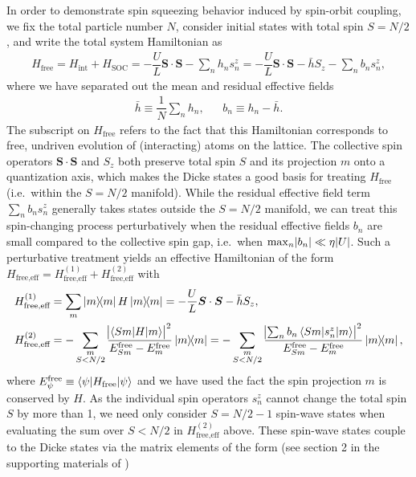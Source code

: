 \documentclass[aps,notitlepage,nofootinbib,11pt]{revtex4-1}
\renewcommand{\t}{\text} %
\newcommand{\f}[2]{\dfrac{#1}{#2}} %
\renewcommand{\v}{\bm} %
\renewcommand{\c}{\cdot} %
\newcommand{\bk}{\braket} %
\newcommand{\1}{\hat{\mathds{1}}}
\begin{document}
In order to demonstrate spin squeezing behavior induced by spin-orbit
coupling, we fix the total particle number $N$, consider initial
states with total spin $S=N/2$, and write the total system Hamiltonian
as
\begin{align}
  H_{\t{free}} = H_{\t{int}} + H_{\t{SOC}}
  = -\f{U}{L} \v S\c\v S - \sum_n h_n s_n^z
  = -\f{U}{L} \v S\c\v S - \bar h S_z - \sum_n b_n s_n^z,
\end{align}
where we have separated out the mean and residual effective fields
\begin{align}
  \bar h \equiv \f1N \sum_n h_n,
  &&
  b_n \equiv h_n - \bar h.
\end{align}
The subscript on $H_{\t{free}}$ refers to the fact that this
Hamiltonian corresponds to free, undriven evolution of (interacting)
atoms on the lattice.  The collective spin operators $\v S\c\v S$ and
$S_z$ both preserve total spin $S$ and its projection $m$ onto a
quantization axis, which makes the Dicke states a good basis for
treating $H_{\t{free}}$ (i.e.~within the $S=N/2$ manifold).  While the
residual effective field term $\sum_n b_n s_n^z$ generally takes
states outside the $S=N/2$ manifold, we can treat this spin-changing
process perturbatively when the residual effective fields $b_n$ are
small compared to the collective spin gap, i.e.~when
$\max_n\abs{b_n}\ll \eta\abs{U}$.  Such a perturbative treatment
yields an effective Hamiltonian of the form
$H_{\t{free,eff}} = H_{\t{free,eff}}^{(1)} + H_{\t{free,eff}}^{(2)}$
with
\begin{align}
  H_{\t{free,eff}}^{(1)}
  &= \sum_m \op{m} H \op{m}
  = -\f{U}{L} \v S \c \v S - \bar h S_z, \\
  H_{\t{free,eff}}^{(2)}
  &= -\sum_{\substack{m\\S<N/2}}
  \frac{\abs{\bk{Sm|H|m}}^2}{E_{Sm}^{\t{free}}-E_m^{\t{free}}} \op{m}
  = -\sum_{\substack{m\\S<N/2}}
  \frac{\abs{\sum_n b_n \bk{Sm|s_n^z|m}}^2}
  {E_{Sm}^{\t{free}}-E_m^{\t{free}}} \op{m},
\end{align}
where $E_\psi^{\t{free}}\equiv\bk{\psi|H_{\t{free}}|\psi}$ and we have
used the fact the spin projection $m$ is conserved by $H$.  As the
individual spin operators $s_n^z$ cannot change the total spin $S$ by
more than 1, we need only consider $S=N/2-1$ spin-wave states when
evaluating the sum over $S<N/2$ in $H_{\t{free,eff}}^{(2)}$ above.
These spin-wave states couple to the Dicke states via the matrix
elements of the form (see section 2 in the supporting materials of
\cite{swallows2011suppression})
\end{document}
